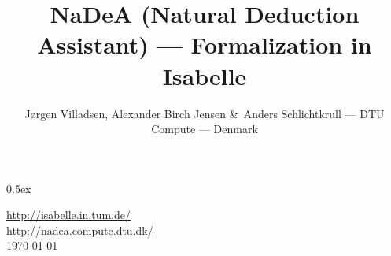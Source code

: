 \documentclass[11pt,a4paper]{article}
\begin{document}
\title{NaDeA (Natural Deduction Assistant) --- Formalization in Isabelle}

\author{J{\o}rgen Villadsen, Alexander Birch Jensen \&\ Anders Schlichtkrull --- DTU Compute --- Denmark}

\date{}

\maketitle


\parindent 0pt\parskip 0.5ex



%
%

\vfill

\begin{center}
\url{http://isabelle.in.tum.de/} \\[1ex]
\url{http://nadea.compute.dtu.dk/} \\[1ex]
\mydate\today
\end{center}
\end{document}
